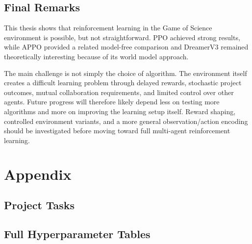 \documentclass[english,bachelor]{hsluthesis}
\begin{document}
\section{Final Remarks}

This thesis shows that reinforcement learning in the Game of Science environment is possible, but not straightforward. PPO achieved strong results, while APPO provided a related model-free comparison and DreamerV3 remained theoretically interesting because of its world model approach.

The main challenge is not simply the choice of algorithm. The environment itself creates a difficult learning problem through delayed rewards, stochastic project outcomes, mutual collaboration requirements, and limited control over other agents. Future progress will therefore likely depend less on testing more algorithms and more on improving the learning setup itself. Reward shaping, controlled environment variants, and a more general observation/action encoding should be investigated before moving toward full multi-agent reinforcement learning.



\footnotesize



\appendix

\chapter{Appendix}

\section{Project Tasks}

\section{Full Hyperparameter Tables}
\end{document}
